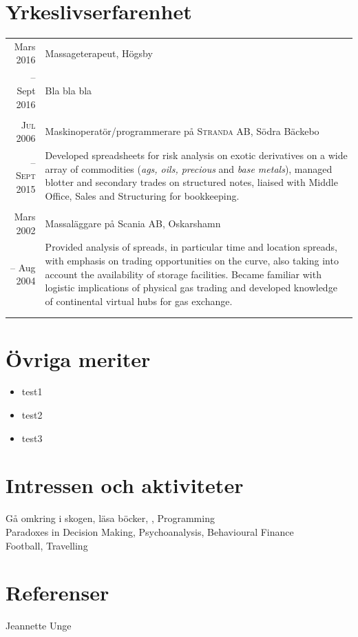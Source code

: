 \documentclass[11pt,a4paper]{article}
\begin{document}
\section{Yrkeslivserfarenhet}
\begin{tabularx}{\textwidth}{r|X}	
	Mars 2016 & Massageterapeut, Högsby \\
	-- Sept 2016&\footnotesize{Bla bla bla}\\
	\multicolumn{2}{c}{} \\

	\textsc{Jul 2006} & Maskinoperatör/programmerare på \textsc{Stranda AB}, Södra Bäckebo \\
	-- \textsc{Sept 2015}&\footnotesize{Developed spreadsheets for risk analysis on exotic derivatives on a wide array of commodities (\textit{ags, oils, precious} and \textit{base metals}), managed blotter and secondary trades on structured notes, liaised with Middle Office, Sales and Structuring for bookkeeping.}\\
	\multicolumn{2}{c}{} \\
	Mars 2002 & Massaläggare på Scania AB, Oskarshamn \\
	-- Aug 2004&\footnotesize{Provided analysis of spreads, in particular time and location spreads, with emphasis on trading opportunities on the curve, also taking into account the availability of storage facilities. Became familiar with logistic implications of physical gas trading and developed knowledge of continental virtual hubs for gas exchange.}\\
	\multicolumn{2}{c}{} \\
\multicolumn{2}{c}{} \\
\end{tabularx}

\section{Övriga meriter}
\begin{itemize}
	\item test1
	\item test2
	\item test3
\end{itemize}

\section{Intressen och aktiviteter}
Gå omkring i skogen, läsa böcker, , Programming\\
Paradoxes in Decision Making, Psychoanalysis, Behavioural Finance\\
Football, Travelling

\section{Referenser}
Jeannette Unge
\end{document}

